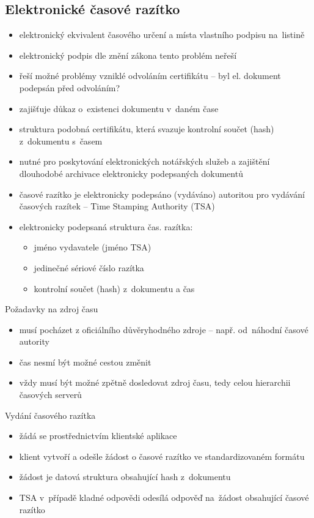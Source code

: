 \subsection{Elektronické časové razítko}
\begin{itemize}
    \item elektronický ekvivalent časového určení a místa vlastního podpisu na~listině
    \item elektronický podpis dle znění zákona tento problém neřeší
    \item řeší možné problémy vzniklé odvoláním certifikátu -- byl el. dokument podepsán před odvoláním?
    \item zajišťuje důkaz o~existenci dokumentu v~daném čase
    \item struktura podobná certifikátu, která svazuje kontrolní součet (hash) z~dokumentu s~časem
    \item nutné pro poskytování elektronických notářských služeb a zajištění dlouhodobé archivace elektronicky podepsaných dokumentů
    \item časové razítko je elektronicky podepsáno (vydáváno) autoritou pro vydávání časových razítek -- Time Stamping Authority (TSA)
    \item elektronicky podepsaná struktura čas. razítka:
    \begin{itemize}
        \item jméno vydavatele (jméno TSA)
        \item jedinečné sériové číslo razítka
        \item kontrolní součet (hash) z~dokumentu a čas
    \end{itemize}
\end{itemize}
Požadavky na zdroj času
\begin{itemize}
    \item musí pocházet z oficiálního důvěryhodného zdroje -- např. od~náhodní časové autority
    \item čas nesmí být možné cestou změnit
    \item vždy musí být možné zpětně dosledovat zdroj času, tedy celou hierarchii časových serverů
\end{itemize}
Vydání časového razítka
\begin{itemize}
    \item žádá se prostřednictvím klientské aplikace
    \item klient vytvoří a odešle žádost o časové razítko ve standardizovaném formátu 
    \item žádost je datová struktura obsahující hash z~dokumentu
    \item TSA v~případě kladné odpovědi odesílá odpověď na~žádost obsahující časové razítko
\end{itemize}


